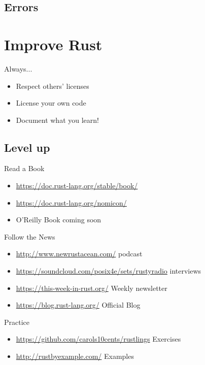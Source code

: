 \documentclass[xcolor={svgnames},hyperref]{beamer}
\begin{document}
\subsection{Errors}

\section{Improve Rust}

    \begin{frame}
        Always...
        \begin{itemize}
            \item Respect others' licenses
            \item License your own code
            \item Document what you learn!
        \end{itemize}
    \end{frame}


\subsection{Level up}

    \begin{frame}
        Read a Book
        \begin{itemize}
            \item \url{https://doc.rust-lang.org/stable/book/}
            \item \url{https://doc.rust-lang.org/nomicon/}
            \item O'Reilly Book coming soon
        \end{itemize}
    \end{frame}

    \begin{frame}
        Follow the News
        \begin{itemize}
            \item \url{http://www.newrustacean.com/} podcast
            \item \url{https://soundcloud.com/posix4e/sets/rustyradio} interviews
            \item \url{https://this-week-in-rust.org/} Weekly newsletter
            \item \url{https://blog.rust-lang.org/} Official Blog
        \end{itemize}
    \end{frame}

    \begin{frame}
        Practice
        \begin{itemize}
            \item \url{https://github.com/carols10cents/rustlings} Exercises
            \item \url{http://rustbyexample.com/} Examples
        \end{itemize}
    \end{frame}
\end{document}
